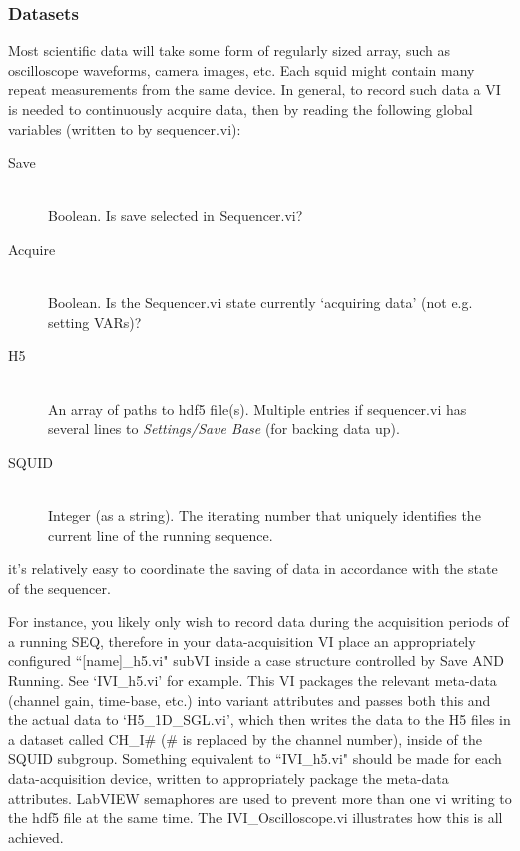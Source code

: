 \documentclass[10pt,a4paper]{article}
\begin{document}
\subsubsection{Datasets}
Most scientific data will take some form of regularly sized array, such as oscilloscope waveforms, camera images, etc.  Each squid might contain many repeat measurements from the same device. In general, to record such data a VI is needed to continuously acquire data, then by reading the following global variables (written to by sequencer.vi):
\begin{description}
	\item[Save] \hfill \\
	Boolean. Is save selected in Sequencer.vi?
	\item[Acquire] \hfill \\
	Boolean. Is the Sequencer.vi state currently `acquiring data' (not e.g. setting VARs)?
	\item[H5] \hfill \\	
	An array of paths to hdf5 file(s).   Multiple entries if sequencer.vi has several lines to \emph{Settings/Save Base} (for backing data up).
	\item[SQUID] \hfill \\
	Integer (as a string). The iterating number that uniquely identifies the current line of the running sequence.

\end{description}
it's relatively easy to coordinate the saving of data in accordance with the state of the sequencer.

For instance, you likely only wish to record data during the acquisition periods of a running SEQ, therefore in your data-acquisition VI place an appropriately configured ``[name]\_h5.vi" subVI inside a case structure controlled by Save AND Running.  See `IVI\_h5.vi' for example.  This VI packages the relevant meta-data (channel gain, time-base, etc.) into variant attributes and passes both this and the actual data to `H5\_1D\_SGL.vi', which then writes the data to the H5 files in a dataset called CH\_I\# (\# is replaced by the channel number), inside of the SQUID subgroup.  Something equivalent to ``IVI\_h5.vi" should be made for each data-acquisition device, written to appropriately package the meta-data attributes.  LabVIEW semaphores are used to prevent more than one vi writing to the hdf5 file at the same time.  The IVI\_Oscilloscope.vi illustrates how this is all achieved.
\end{document}

